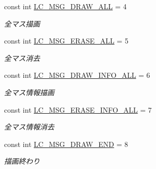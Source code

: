 \begin{DoxyCompactItemize}
\mbox{\label{class_reversi_form_1_1_reversi_const_a111c89c737238b905857c2ab62018b26}} 
const int \hyperlink{class_reversi_form_1_1_reversi_const_a111c89c737238b905857c2ab62018b26}{L\+C\+\_\+\+M\+S\+G\+\_\+\+D\+R\+A\+W\+\_\+\+A\+LL} = 4
\begin{DoxyCompactList}\small\item\em 全マス描画 \end{DoxyCompactList}\item 
\mbox{\label{class_reversi_form_1_1_reversi_const_a3d4e378704f145b79de91103a1ee681e}} 
const int \hyperlink{class_reversi_form_1_1_reversi_const_a3d4e378704f145b79de91103a1ee681e}{L\+C\+\_\+\+M\+S\+G\+\_\+\+E\+R\+A\+S\+E\+\_\+\+A\+LL} = 5
\begin{DoxyCompactList}\small\item\em 全マス消去 \end{DoxyCompactList}\item 
\mbox{\label{class_reversi_form_1_1_reversi_const_a19ae5ea5e70166149b126d68362ed349}} 
const int \hyperlink{class_reversi_form_1_1_reversi_const_a19ae5ea5e70166149b126d68362ed349}{L\+C\+\_\+\+M\+S\+G\+\_\+\+D\+R\+A\+W\+\_\+\+I\+N\+F\+O\+\_\+\+A\+LL} = 6
\begin{DoxyCompactList}\small\item\em 全マス情報描画 \end{DoxyCompactList}\item 
\mbox{\label{class_reversi_form_1_1_reversi_const_a7d86ec48faf79a41508c9c0f6417aa54}} 
const int \hyperlink{class_reversi_form_1_1_reversi_const_a7d86ec48faf79a41508c9c0f6417aa54}{L\+C\+\_\+\+M\+S\+G\+\_\+\+E\+R\+A\+S\+E\+\_\+\+I\+N\+F\+O\+\_\+\+A\+LL} = 7
\begin{DoxyCompactList}\small\item\em 全マス情報消去 \end{DoxyCompactList}\item 
\mbox{\label{class_reversi_form_1_1_reversi_const_ac62152472c76340dc99539bf761a4665}} 
const int \hyperlink{class_reversi_form_1_1_reversi_const_ac62152472c76340dc99539bf761a4665}{L\+C\+\_\+\+M\+S\+G\+\_\+\+D\+R\+A\+W\+\_\+\+E\+ND} = 8
\begin{DoxyCompactList}\small\item\em 描画終わり \end{DoxyCompactList}\item 

\end{DoxyCompactItemize}
